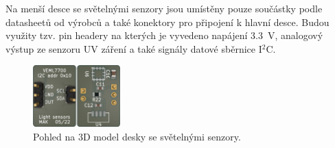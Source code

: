 Na menší desce se světelnými senzory jsou umístěny pouze součástky podle datasheetů od výrobců a také konektory pro připojení k hlavní desce. Budou využity tzv. pin headery na kterých je vyvedeno napájení \SI{3.3}{\volt}, analogový výstup ze senzoru UV záření a také signály datové sběrnice I$^2$C.

\begin{figure}
    \centering
    \includegraphics[width=0.3\textwidth]{obrazky/sensorBoard-kicad.png}
    \caption{Pohled na 3D model desky se světelnými senzory.}
    \label{fig_sensorBoardKicadRender}
\end{figure}





